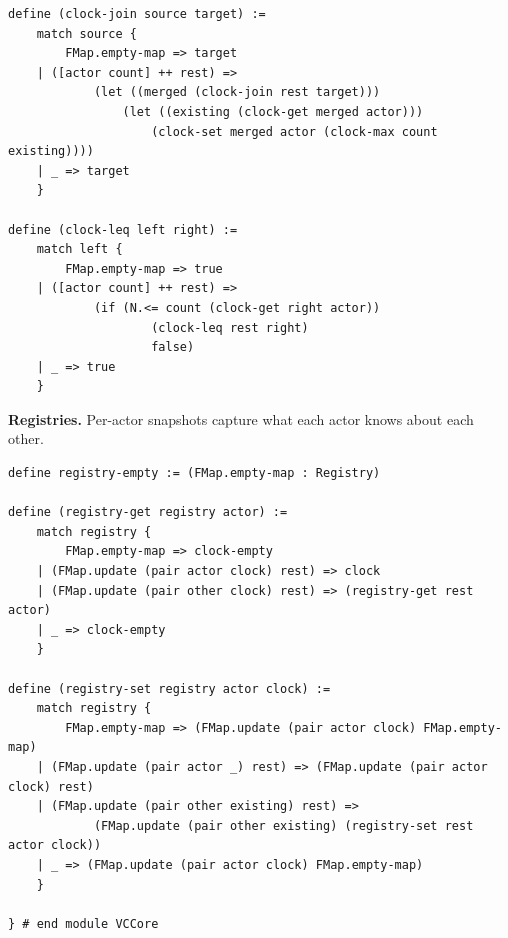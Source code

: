 \begin{lstlisting}
define (clock-join source target) :=
    match source {
        FMap.empty-map => target
    | ([actor count] ++ rest) =>
            (let ((merged (clock-join rest target)))
                (let ((existing (clock-get merged actor)))
                    (clock-set merged actor (clock-max count existing))))
    | _ => target
    }

define (clock-leq left right) :=
    match left {
        FMap.empty-map => true
    | ([actor count] ++ rest) =>
            (if (N.<= count (clock-get right actor))
                    (clock-leq rest right)
                    false)
    | _ => true
    }
\end{lstlisting}

\noindent\textbf{Registries.} Per-actor snapshots capture what each actor knows about each other.


\begin{lstlisting}
define registry-empty := (FMap.empty-map : Registry)

define (registry-get registry actor) :=
    match registry {
        FMap.empty-map => clock-empty
    | (FMap.update (pair actor clock) rest) => clock
    | (FMap.update (pair other clock) rest) => (registry-get rest actor)
    | _ => clock-empty
    }

define (registry-set registry actor clock) :=
    match registry {
        FMap.empty-map => (FMap.update (pair actor clock) FMap.empty-map)
    | (FMap.update (pair actor _) rest) => (FMap.update (pair actor clock) rest)
    | (FMap.update (pair other existing) rest) =>
            (FMap.update (pair other existing) (registry-set rest actor clock))
    | _ => (FMap.update (pair actor clock) FMap.empty-map)
    }

} # end module VCCore
\end{lstlisting}

